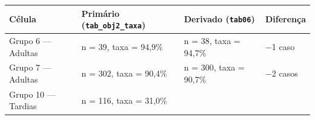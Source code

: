 \documentclass[
]{article}
\begin{document}
\begin{longtable}[]{@{}llll@{}}
\toprule
\begin{minipage}[b]{0.22\columnwidth}\raggedright
Célula\strut
\end{minipage} & \begin{minipage}[b]{0.22\columnwidth}\raggedright
Primário (\texttt{tab\_obj2\_taxa})\strut
\end{minipage} & \begin{minipage}[b]{0.22\columnwidth}\raggedright
Derivado (\texttt{tab06})\strut
\end{minipage} & \begin{minipage}[b]{0.22\columnwidth}\raggedright
Diferença\strut
\end{minipage}\tabularnewline
\midrule
\endhead
\begin{minipage}[t]{0.22\columnwidth}\raggedright
Grupo 6 --- Adultas\strut
\end{minipage} & \begin{minipage}[t]{0.22\columnwidth}\raggedright
n = 39, taxa = 94,9\%\strut
\end{minipage} & \begin{minipage}[t]{0.22\columnwidth}\raggedright
n = 38, taxa = 94,7\%\strut
\end{minipage} & \begin{minipage}[t]{0.22\columnwidth}\raggedright
−1 caso\strut
\end{minipage}\tabularnewline
\begin{minipage}[t]{0.22\columnwidth}\raggedright
Grupo 7 --- Adultas\strut
\end{minipage} & \begin{minipage}[t]{0.22\columnwidth}\raggedright
n = 302, taxa = 90,4\%\strut
\end{minipage} & \begin{minipage}[t]{0.22\columnwidth}\raggedright
n = 300, taxa = 90,7\%\strut
\end{minipage} & \begin{minipage}[t]{0.22\columnwidth}\raggedright
−2 casos\strut
\end{minipage}\tabularnewline
\begin{minipage}[t]{0.22\columnwidth}\raggedright
Grupo 10 --- Tardias\strut
\end{minipage} & \begin{minipage}[t]{0.22\columnwidth}\raggedright
n = 116, taxa = 31,0\%\strut
\end{minipage} & \begin{minipage}[t]{0.22\columnwidth}\raggedright

\end{minipage}
\end{longtable}
\end{document}
